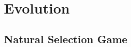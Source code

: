 \section{Evolution}

\begin{multicols}{2}




\subsection{Natural Selection Game} %



\end{multicols}
